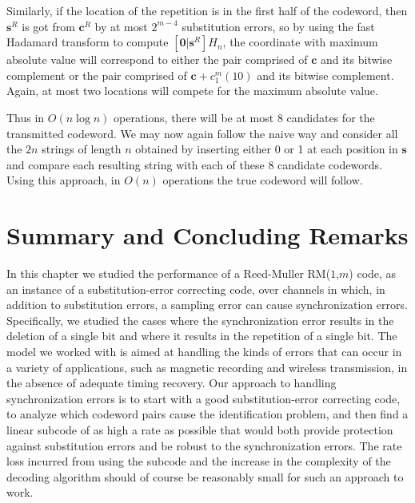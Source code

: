 Similarly, if the location of the repetition  is in the first half
of the codeword, then $\mathbf{s}^R$ is got from $\mathbf{c}^R$ by
at most  $2^{m-4}$ substitution errors, so by using the fast
Hadamard transform to compute $\left[ \mathbf{0} | \mathbf{s}^R
\right] H_n$, the coordinate with maximum absolute value will
correspond to either the pair comprised of $\mathbf{c}$ and its
bitwise complement or the pair comprised of $\mathbf{c} +
c_1^m(10)$ and its bitwise complement. Again, at most two
locations will compete for the maximum absolute value.

Thus in $O(n \log n)$ operations, there will be at most $8$
candidates for the transmitted codeword. We may now again follow
the naive way and consider all the $2n$ strings of length $n$
obtained by inserting either 0 or 1 at each position in
$\mathbf{s}$ and compare each resulting string with each of these
$8$ candidate codewords. Using this approach, in $O(n)$ operations
the true codeword will follow.

\section{Summary and Concluding Remarks}\label{sectionconcRM}

In this chapter we studied the performance of a Reed-Muller
RM($1$,$m$) code, as an instance of a substitution-error correcting
code, over channels in which, in addition to substitution errors, a
sampling error can cause synchronization errors. Specifically, we
studied the cases where the synchronization error results in the
deletion of a single bit and where it results in the repetition of a
single bit. The model we worked with is aimed at handling the kinds
of errors that can occur in a variety of applications, such as
magnetic recording and wireless transmission, in the absence of
adequate timing recovery. Our approach to handling synchronization
errors is to start with a good substitution-error correcting code,
to analyze which codeword pairs cause the identification problem,
and then find a linear subcode of as high a rate as possible that
would both provide protection against substitution errors and be
robust to the synchronization errors. The rate loss incurred from
using the subcode and the increase in the complexity of the decoding
algorithm should of course be reasonably small for such an approach
to work.



